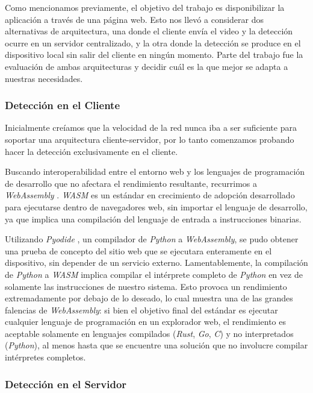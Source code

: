 \documentclass[a4paper]{article}
\begin{document}
Como mencionamos previamente, el objetivo del trabajo es disponibilizar la aplicación a través de una página web. Esto nos llevó a considerar dos alternativas de arquitectura, una donde el cliente envía el video y la detección ocurre en un servidor centralizado, y la otra donde la detección se produce en el dispositivo local sin salir del cliente en ningún momento. Parte del trabajo fue la evaluación de ambas arquitecturas y decidir cuál es la que mejor se adapta a nuestras necesidades.

\subsubsection{Detección en el Cliente}

Inicialmente creíamos que la velocidad de la red nunca iba a ser suficiente para soportar una arquitectura cliente-servidor, por lo tanto comenzamos probando hacer la detección exclusivamente en el cliente.

Buscando interoperabilidad entre el entorno web y los lenguajes de programación de desarrollo que no afectara el rendimiento resultante, recurrimos a \textit{WebAssembly} \cite{wasm}. \textit{WASM} es un estándar en crecimiento de adopción desarrollado para ejecutarse dentro de navegadores web, sin importar el lenguaje de desarrollo, ya que implica una compilación del lenguaje de entrada a instrucciones binarias.\medskip

Utilizando \textit{Pyodide} \cite{pyodide}, un compilador de \textit{Python} a \textit{WebAssembly}, se pudo obtener una prueba de concepto del sitio web que se ejecutara enteramente en el dispositivo, sin depender de un servicio externo. Lamentablemente, la compilación de \textit{Python} a \textit{WASM} implica compilar el intérprete completo de \textit{Python} en vez de solamente las instrucciones de nuestro sistema. Esto provoca un rendimiento extremadamente por debajo de lo deseado, lo cual muestra una de las grandes falencias de \textit{WebAssembly}: si bien el objetivo final del estándar es ejecutar cualquier lenguaje de programación en un explorador web, el rendimiento es aceptable solamente en lenguajes compilados (\textit{Rust}, \textit{Go}, \textit{C}) y no interpretados (\textit{Python}), al menos hasta que se encuentre una solución que no involucre compilar intérpretes completos.

\subsubsection{Detección en el Servidor}
\end{document}
